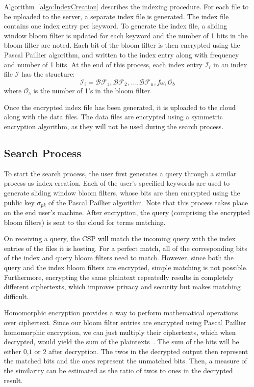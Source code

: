 Algorithm~\ref{algo:IndexCreation} describes the indexing procedure.
For each file to be uploaded to the server, a separate index file is generated. The index
file contains one index entry per keyword. To generate the index file, a sliding window bloom
filter is updated for each keyword and the number of 1 bits in the bloom filter are noted.
Each bit of the bloom filter is then encrypted using the Pascal Paillier algorithm, and written to 
the index entry along with frequency and number of 1 bits.
At the end of this process, each index entry $\mathcal{I}_i$ in an index file $\mathcal{I}$ has
the structure: 
\begin{equation}
\mathcal{I}_i = \mathcal{BF}_1,\mathcal{BF}_2, \ldots ,\mathcal{BF}_n, f\omega,
\mathcal{O}_b
  \label{eq: indexEntry}
\end{equation} 
where $\mathcal{O}_b$ is the number of 1's in the bloom filter.

Once the encrypted index file has been generated, it is uploaded to the cloud along with the data files.
The data files are encrypted using a symmetric encryption algorithm, as they will not be used during the
search process.

\subsection{Search Process}

To start the search process, the user first generates a query through a similar process as index creation. 
Each of the user's specified keywords are used to generate sliding window bloom filters, whose bits are then
encrypted using the public key $\sigma_{pk}$ of the Pascal Paillier algorithm. 
Note that this process takes place on the end user's machine. After encryption, 
the query (comprising the encrypted bloom filters) is sent to the cloud for terms matching.

On receiving a query, the CSP will match the incoming query with the index entries of 
the files it is hosting. For a perfect match, all of the corresponding bits of the index 
and query bloom filters need to match. However, since both the query and the index
bloom filters are encrypted, simple matching is not possible. Furthermore, encrypting the
same plaintext repeatedly results in completely different ciphertexts, which improves
privacy and security but makes matching difficult.

Homomorphic encryption provides a way to perform mathematical operations 
over ciphertext. Since our bloom filter entries are encrypted using Pascal Paillier homomorphic
encryption, we can just multiply their ciphertexts, which when decrypted, would yield the sum of
the plaintexts~\cite{pascal}. The sum of the bits will be either $0$,$1$ or $2$ after decryption.
The twos in the decrypted output then represent the matched
bits and the ones represent the unmatched bits. Then, a measure of the similarity
can be estimated as the ratio of twos to ones in the decrypted result.


